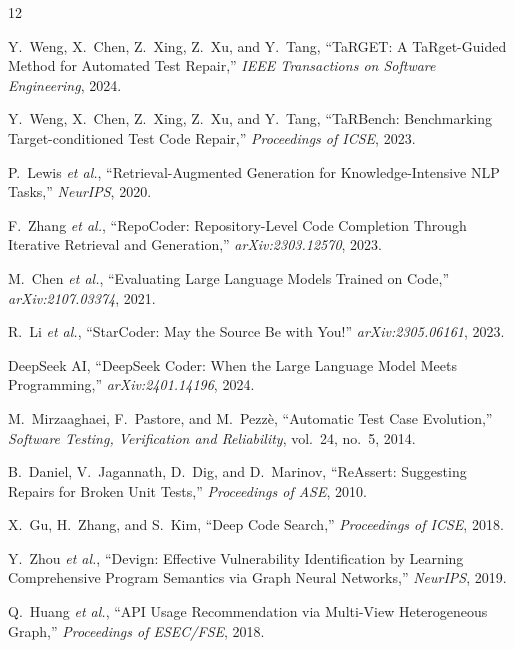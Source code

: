 \documentclass[conference,10pt]{IEEEtran}
\begin{document}
\begin{thebibliography}{12}

Y.~Weng, X.~Chen, Z.~Xing, Z.~Xu, and Y.~Tang,
``TaRGET: A TaRget-Guided Method for Automated Test Repair,''
\emph{IEEE Transactions on Software Engineering}, 2024.

Y.~Weng, X.~Chen, Z.~Xing, Z.~Xu, and Y.~Tang,
``TaRBench: Benchmarking Target-conditioned Test Code Repair,''
\emph{Proceedings of ICSE}, 2023.

P.~Lewis \emph{et al.},
``Retrieval-Augmented Generation for Knowledge-Intensive NLP Tasks,''
\emph{NeurIPS}, 2020.

F.~Zhang \emph{et al.},
``RepoCoder: Repository-Level Code Completion Through Iterative Retrieval
and Generation,''
\emph{arXiv:2303.12570}, 2023.

M.~Chen \emph{et al.},
``Evaluating Large Language Models Trained on Code,''
\emph{arXiv:2107.03374}, 2021.

R.~Li \emph{et al.},
``StarCoder: May the Source Be with You!''
\emph{arXiv:2305.06161}, 2023.

DeepSeek AI,
``DeepSeek Coder: When the Large Language Model Meets Programming,''
\emph{arXiv:2401.14196}, 2024.

M.~Mirzaaghaei, F.~Pastore, and M.~Pezz\`{e},
``Automatic Test Case Evolution,''
\emph{Software Testing, Verification and Reliability}, vol.~24, no.~5, 2014.

B.~Daniel, V.~Jagannath, D.~Dig, and D.~Marinov,
``ReAssert: Suggesting Repairs for Broken Unit Tests,''
\emph{Proceedings of ASE}, 2010.

X.~Gu, H.~Zhang, and S.~Kim,
``Deep Code Search,''
\emph{Proceedings of ICSE}, 2018.

Y.~Zhou \emph{et al.},
``Devign: Effective Vulnerability Identification by Learning Comprehensive
Program Semantics via Graph Neural Networks,''
\emph{NeurIPS}, 2019.

Q.~Huang \emph{et al.},
``API Usage Recommendation via Multi-View Heterogeneous Graph,''
\emph{Proceedings of ESEC/FSE}, 2018.

\end{thebibliography}
\end{document}
